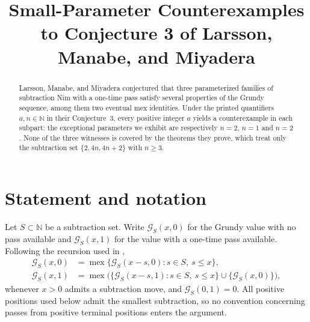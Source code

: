 \documentclass[11pt]{amsart}
\title[Counterexamples to Conjecture 3]
{Small-Parameter Counterexamples to Conjecture 3 of Larsson, Manabe, and Miyadera}
\date{}
\theoremstyle{remark}
\newcommand{\mex}{\operatorname{mex}}
\newcommand{\G}{\mathcal{G}}
\begin{document}
\begin{abstract}
Larsson, Manabe, and Miyadera conjectured that three parameterized
families of subtraction Nim with a one-time pass satisfy several
properties of the Grundy sequence, among them two eventual mex
identities. Under the printed quantifiers $a,n\in\mathbb N$ in their
Conjecture~3, every positive integer $a$ yields a counterexample in
each subpart: the exceptional parameters we exhibit are respectively
$n=2$, $n=1$ and $n=2$. None of the three witnesses is covered by the
theorems they prove, which treat only the subtraction set
$\{2,4n,4n+2\}$ with $n\geq3$.
\end{abstract}

\maketitle

\section{Statement and notation}

Let $S\subset\mathbb N$ be a subtraction set. Write $\G_S(x,0)$ for
the Grundy value with no pass available and $\G_S(x,1)$ for the value
with a one-time pass available. Following the recursion used in
\cite{LMM},
\begin{align}
\G_S(x,0)
 &=\mex\{\G_S(x-s,0):s\in S,\ s\leq x\},
 \label{eq:no-pass}\\
\G_S(x,1)
 &=\mex\bigl(
     \{\G_S(x-s,1):s\in S,\ s\leq x\}
     \cup\{\G_S(x,0)\}
   \bigr),
 \label{eq:pass}
\end{align}
whenever $x>0$ admits a subtraction move, and $\G_S(0,1)=0$.
All positive positions used below admit the smallest subtraction, so
no convention concerning passes from positive terminal positions
enters the argument.
\end{document}

